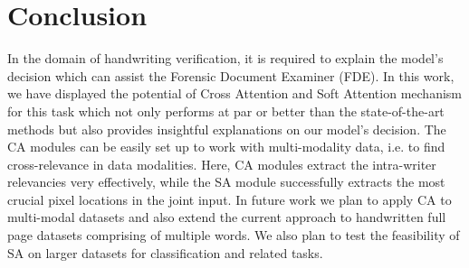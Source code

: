 \documentclass[a4paper,conference]{IEEEtran}
\begin{document}
\section{Conclusion}
In the domain of handwriting verification, it is required to explain the model's decision which can assist the Forensic Document Examiner (FDE). In this work, we have displayed the potential of Cross Attention and Soft Attention mechanism for this task which not only performs at par or better than the state-of-the-art methods but also provides insightful explanations on our model's decision. The CA modules can be easily set up to work with multi-modality data, i.e. to find cross-relevance in data modalities. Here, CA modules extract the intra-writer relevancies very effectively, while the SA module successfully extracts the most crucial pixel locations in the joint input. In future work we plan to apply CA to multi-modal datasets and also extend the current approach to handwritten full page datasets comprising of multiple words. We also plan to test the feasibility of SA on larger datasets for classification and related tasks.



 

\end{document}

